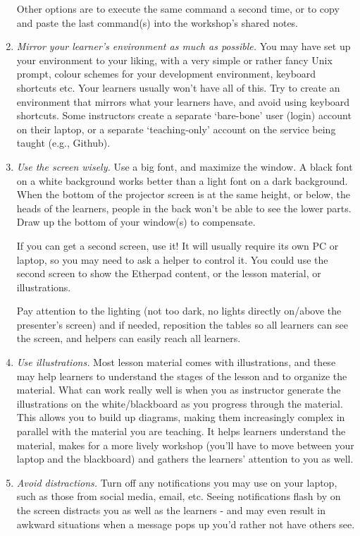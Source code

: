\begin{enumerate}
  Other options are to execute the same command a second time, or to
  copy and paste the last command(s) into the workshop's shared notes.

\item
  \emph{Mirror your learner's environment as much as possible.}  You
  may have set up your environment to your liking, with a very simple
  or rather fancy Unix prompt, colour schemes for your development
  environment, keyboard shortcuts etc. Your learners usually won't
  have all of this. Try to create an environment that mirrors what
  your learners have, and avoid using keyboard shortcuts. Some
  instructors create a separate `bare-bone' user (login) account on
  their laptop, or a separate `teaching-only' account on the service
  being taught (e.g., Github).

\item
  \emph{Use the screen wisely.}  Use a big font, and maximize the
  window. A black font on a white background works better than a light
  font on a dark background. When the bottom of the projector screen
  is at the same height, or below, the heads of the learners, people
  in the back won't be able to see the lower parts. Draw up the bottom
  of your window(s) to compensate.

  If you can get a second screen, use it! It will usually require its
  own PC or laptop, so you may need to ask a helper to control it. You
  could use the second screen to show the Etherpad content, or the
  lesson material, or illustrations.

  Pay attention to the lighting (not too dark, no lights directly
  on/above the presenter's screen) and if needed, reposition the
  tables so all learners can see the screen, and helpers can easily
  reach all learners.

\item
  \emph{Use illustrations.}  Most lesson material comes with
  illustrations, and these may help learners to understand the stages
  of the lesson and to organize the material. What can work really
  well is when you as instructor generate the illustrations on the
  white/blackboard as you progress through the material. This allows
  you to build up diagrams, making them increasingly complex in
  parallel with the material you are teaching. It helps learners
  understand the material, makes for a more lively workshop (you'll
  have to move between your laptop and the blackboard) and gathers the
  learners' attention to you as well.

\item
  \emph{Avoid distractions.}  Turn off any notifications you may use
  on your laptop, such as those from social media, email, etc. Seeing
  notifications flash by on the screen distracts you as well as the
  learners - and may even result in awkward situations when a message
  pops up you'd rather not have others see.


\end{enumerate}
